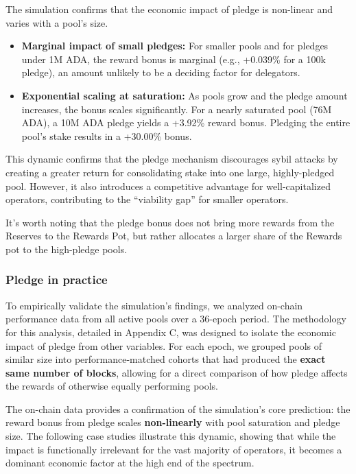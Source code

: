 \documentclass[11pt, letterpaper]{article}
\begin{document}
The simulation confirms that the economic impact of pledge is non-linear and
varies with a pool's size.

\begin{itemize}
	\item \textbf{Marginal impact of small pledges:} For smaller pools and for pledges under 1M ADA, the reward
	      bonus is marginal (e.g., +0.039\% for a 100k pledge), an amount unlikely to be a deciding factor for
	      delegators.
	\item \textbf{Exponential scaling at saturation:} As pools grow and the pledge amount increases, the bonus
	      scales significantly. For a nearly saturated pool (76M ADA), a 10M ADA pledge yields a +3.92\% reward
	      bonus. Pledging the entire pool's stake results in a +30.00\% bonus.
\end{itemize}

This dynamic confirms that the pledge mechanism discourages sybil attacks by
creating a greater return for consolidating stake into one large,
highly-pledged pool. However, it also introduces a competitive advantage for
well-capitalized operators, contributing to the ``viability gap'' for smaller
operators.

It's worth noting that the pledge bonus does not bring more rewards from the
Reserves to the Rewards Pot, but rather allocates a larger share of the Rewards
pot to the high-pledge pools.

\subsubsection{Pledge in practice}

To empirically validate the simulation's findings, we analyzed on-chain
performance data from all active pools over a 36-epoch period. The methodology
for this analysis, detailed in Appendix C, was designed to isolate the economic
impact of pledge from other variables. For each epoch, we grouped pools of
similar size into performance-matched cohorts that had produced the
\textbf{exact same number of blocks}, allowing for a direct comparison of how
pledge affects the rewards of otherwise equally performing pools.

The on-chain data provides a confirmation of the simulation's core prediction: the reward
bonus from pledge scales \textbf{non-linearly} with pool saturation and pledge size.
The following case studies illustrate this dynamic, showing that while the impact is functionally
irrelevant for the vast majority of operators, it becomes a dominant economic
factor at the high end of the spectrum.
\end{document}
